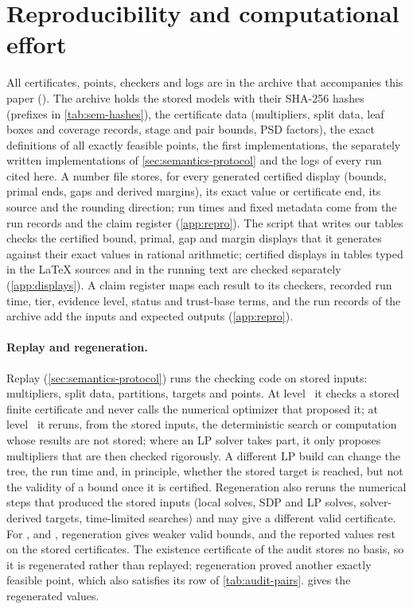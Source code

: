 \section{Reproducibility and computational effort}\label{sec:repro}

All certificates, points, checkers and logs are in the archive that accompanies this paper (\archiveDOI).
The archive holds the stored models with their SHA-256 hashes (prefixes in \cref{tab:sem-hashes}), the certificate data (multipliers, split data, leaf boxes and coverage records, stage and pair bounds, PSD factors), the exact definitions of all exactly feasible points, the first implementations, the separately written implementations of \cref{sec:semantics-protocol} and the logs of every run cited here.
A number file stores, for every generated certified display (bounds, primal ends, gaps and derived margins), its exact value or certificate end, its source and the rounding direction; run times and fixed metadata come from the run records and the claim register (\cref{app:repro}).
The script that writes our tables checks the certified bound, primal, gap and margin displays that it generates against their exact values in rational arithmetic; certified displays in tables typed in the LaTeX sources and in the running text are checked separately (\cref{app:displays}).
A claim register maps each result to its checkers, recorded run time, tier, evidence level, status and trust-base terms, and the run records of the archive add the inputs and expected outputs (\cref{app:repro}).

\paragraph{Replay and regeneration.}
Replay (\cref{sec:semantics-protocol}) runs the checking code on stored inputs: multipliers, split data, partitions, targets and points.
At level~ it checks a stored finite certificate and never calls the numerical optimizer that proposed it; at level~ it reruns, from the stored inputs, the deterministic search or computation whose results are not stored; where an LP solver takes part, it only proposes multipliers that are then checked rigorously.
A different LP build can change the tree, the run time and, in principle, whether the stored target is reached, but not the validity of a bound once it is certified.
Regeneration also reruns the numerical steps that produced the stored inputs (local solves, SDP and LP solves, solver-derived targets, time-limited searches) and may give a different valid certificate.
For ,  and , regeneration gives weaker valid bounds, and the reported values rest on the stored certificates.
The  existence certificate of the audit stores no basis, so it is regenerated rather than replayed; regeneration proved another exactly feasible point, which also satisfies its row of \cref{tab:audit-pairs}.
 gives the regenerated values.

